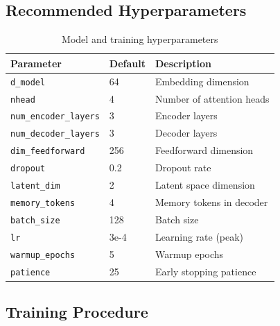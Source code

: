 \documentclass[12pt,a4paper]{article}
\begin{document}
\subsection{Recommended Hyperparameters}

\begin{table}[h]
\centering
\begin{tabular}{@{}lll@{}}
\toprule
\textbf{Parameter} & \textbf{Default} & \textbf{Description} \\
\midrule
\texttt{d\_model} & 64 & Embedding dimension \\
\texttt{nhead} & 4 & Number of attention heads \\
\texttt{num\_encoder\_layers} & 3 & Encoder layers \\
\texttt{num\_decoder\_layers} & 3 & Decoder layers \\
\texttt{dim\_feedforward} & 256 & Feedforward dimension \\
\texttt{dropout} & 0.2 & Dropout rate \\
\texttt{latent\_dim} & 2 & Latent space dimension \\
\texttt{memory\_tokens} & 4 & Memory tokens in decoder \\
\texttt{batch\_size} & 128 & Batch size \\
\texttt{lr} & 3e-4 & Learning rate (peak) \\
\texttt{warmup\_epochs} & 5 & Warmup epochs \\
\texttt{patience} & 25 & Early stopping patience \\
\bottomrule
\end{tabular}
\caption{Model and training hyperparameters}
\end{table}

\subsection{Training Procedure}
\end{document}
